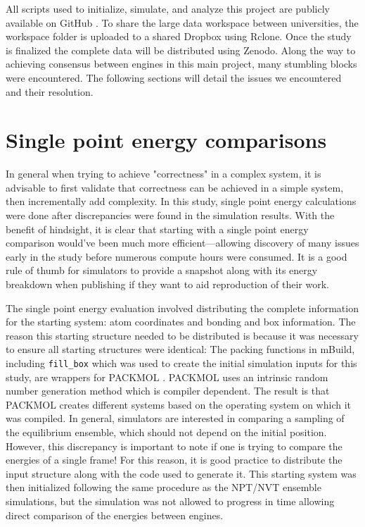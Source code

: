 All scripts used to initialize, simulate, and analyze this project are publicly available on GitHub \citep{reproducibility}.
To share the large data workspace between universities, the workspace folder is uploaded to a shared Dropbox using Rclone. 
Once the study is finalized the complete data will be distributed using Zenodo.
Along the way to achieving consensus between engines in this main project, many stumbling blocks were encountered. 
The following sections will detail the issues we encountered and their resolution.

\section{Single point energy comparisons}

In general when trying to achieve "correctness" in a complex system, it is advisable to first validate that correctness can be achieved in a simple system, then incrementally add complexity.
In this study, single point energy calculations were done after discrepancies were found in the simulation results.
With the benefit of hindsight, it is clear that starting with a single point energy comparison would've been much more efficient---allowing discovery of many issues early in the study before numerous compute hours were consumed. 
It is a good rule of thumb for simulators to provide a snapshot along with its energy breakdown when publishing if they want to aid reproduction of their work.

The single point energy evaluation involved distributing the complete information for the starting system: atom coordinates and bonding and box information. 
The reason this starting structure needed to be distributed is because it was necessary to ensure all starting structures were identical:
The packing functions in mBuild, including \lstinline{fill_box} which was used to create the initial simulation inputs for this study, are wrappers for PACKMOL \citep{Martinez2003, Martinez2009}.
PACKMOL uses an intrinsic random number generation method which is compiler dependent. 
The result is that PACKMOL creates different systems based on the operating system on which it was compiled.
In general, simulators are interested in comparing a sampling of the equilibrium ensemble, which should not depend on the initial position.
However, this discrepancy is important to note if one is trying to compare the energies of a single frame!
For this reason, it is good practice to distribute the input structure along with the code used to generate it.
This starting system was then initialized following the same procedure as the NPT/NVT ensemble simulations, but the simulation was not allowed to progress in time allowing direct comparison of the energies between engines.

